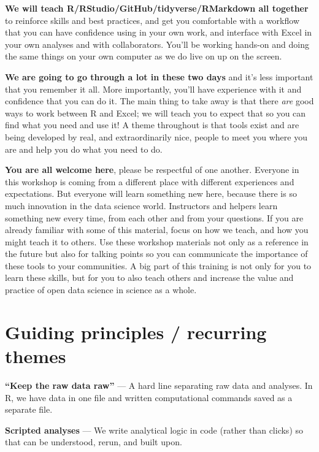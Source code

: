 \documentclass[]{book}
\begin{document}
\textbf{We will teach R/RStudio/GitHub/tidyverse/RMarkdown all together} to reinforce skills and best practices, and get you comfortable with a workflow that you can have confidence using in your own work, and interface with Excel in your own analyses and with collaborators. You'll be working hands-on and doing the same things on your own computer as we do live on up on the screen.

\textbf{We are going to go through a lot in these two days} and it's less important that you remember it all. More importantly, you'll have experience with it and confidence that you can do it. The main thing to take away is that there \emph{are} good ways to work between R and Excel; we will teach you to expect that so you can find what you need and use it! A theme throughout is that tools exist and are being developed by real, and extraordinarily nice, people to meet you where you are and help you do what you need to do.

\textbf{You are all welcome here}, please be respectful of one another. Everyone in this workshop is coming from a different place with different experiences and expectations. But everyone will learn something new here, because there is so much innovation in the data science world. Instructors and helpers learn something new every time, from each other and from your questions. If you are already familiar with some of this material, focus on how we teach, and how you might teach it to others. Use these workshop materials not only as a reference in the future but also for talking points so you can communicate the importance of these tools to your communities. A big part of this training is not only for you to learn these skills, but for you to also teach others and increase the value and practice of open data science in science as a whole.

\hypertarget{guiding-principles-recurring-themes}{%
\section{Guiding principles / recurring themes}\label{guiding-principles-recurring-themes}}

\textbf{``Keep the raw data raw''} --- A hard line separating raw data and analyses. In R, we have data in one file and written computational commands saved as a separate file.

\textbf{Scripted analyses} --- We write analytical logic in code (rather than clicks) so that can be understood, rerun, and built upon.
\end{document}
